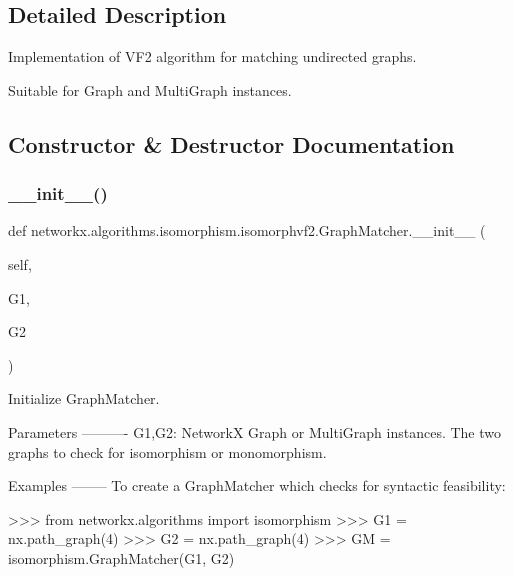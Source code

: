 \subsection{Detailed Description}
\begin{DoxyVerb}Implementation of VF2 algorithm for matching undirected graphs.

Suitable for Graph and MultiGraph instances.
\end{DoxyVerb}
 

\subsection{Constructor \& Destructor Documentation}
\mbox{\label{classnetworkx_1_1algorithms_1_1isomorphism_1_1isomorphvf2_1_1GraphMatcher_ae2e418c559a20cb013c0068f8ce232c7}} 
\subsubsection{\texorpdfstring{\+\_\+\+\_\+init\+\_\+\+\_\+()}{\_\_init\_\_()}}
{\footnotesize\ttfamily def networkx.\+algorithms.\+isomorphism.\+isomorphvf2.\+Graph\+Matcher.\+\_\+\+\_\+init\+\_\+\+\_\+ (\begin{DoxyParamCaption}\item[{}]{self,  }\item[{}]{G1,  }\item[{}]{G2 }\end{DoxyParamCaption})}

\begin{DoxyVerb}Initialize GraphMatcher.

Parameters
----------
G1,G2: NetworkX Graph or MultiGraph instances.
   The two graphs to check for isomorphism or monomorphism.

Examples
--------
To create a GraphMatcher which checks for syntactic feasibility:

>>> from networkx.algorithms import isomorphism
>>> G1 = nx.path_graph(4)
>>> G2 = nx.path_graph(4)
>>> GM = isomorphism.GraphMatcher(G1, G2)
\end{DoxyVerb}
 

